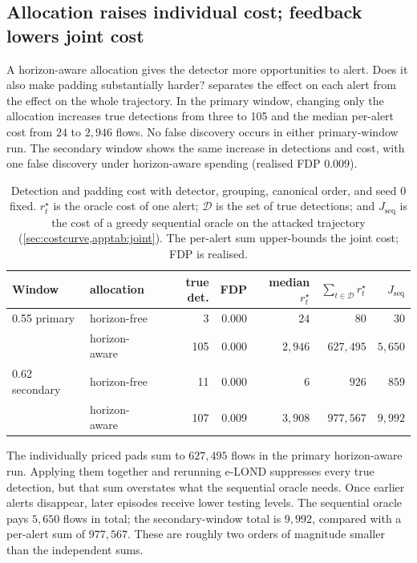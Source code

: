 \documentclass[conference]{IEEEtran}
\begin{document}
\subsection{Allocation raises individual cost; feedback lowers joint cost}\label{sec:costcurve}

A horizon-aware allocation gives the detector more opportunities to alert. Does it also make padding
substantially harder?  separates the effect on each alert from the effect on the
whole trajectory. In the primary window, changing only the allocation increases true detections from
three to 105 and the median per-alert cost from $24$ to $2{,}946$ flows. No false discovery occurs
in either primary-window run. The secondary window shows the same increase in detections and cost,
with one false discovery under horizon-aware spending (realised FDP $0.009$).

\begin{table}[t]
\centering
\caption{Detection and padding cost with detector, grouping, canonical order, and seed 0 fixed.
$r^{\star}_t$ is the oracle cost of one alert; $\mathcal D$ is the set of true detections; and
$J_{\mathrm{seq}}$ is the cost of a greedy sequential oracle on the attacked trajectory
(\cref{sec:costcurve,apptab:joint}). The per-alert sum upper-bounds the joint cost; FDP is realised.}
\label{tab:costcurve}
\footnotesize
\setlength{\tabcolsep}{8pt}
\begin{tabular}{@{}llrrrrr@{}}
\toprule
Window & allocation & true det. & FDP & median $r^{\star}_t$ & $\sum_{t\in\mathcal D} r^{\star}_t$ & $J_{\mathrm{seq}}$ \\
\midrule
0.55 primary & horizon-free & 3 & 0.000 & $24$ & $80$ & $30$ \\
\quad & horizon-aware & 105 & 0.000 & $2{,}946$ & $627{,}495$ & $5{,}650$ \\
\midrule
0.62 secondary & horizon-free & 11 & 0.000 & $6$ & $926$ & $859$ \\
\quad & horizon-aware & 107 & 0.009 & $3{,}908$ & $977{,}567$ & $9{,}992$ \\
\bottomrule
\end{tabular}
\end{table}

The individually priced pads sum to $627{,}495$ flows in the primary horizon-aware run. Applying
them together and rerunning e-LOND suppresses every true detection, but that sum overstates what
the sequential oracle needs. Once earlier alerts disappear, later episodes receive lower testing
levels. The sequential oracle pays $5{,}650$ flows in total; the secondary-window total is
$9{,}992$, compared with a per-alert sum of $977{,}567$. These are roughly two orders of magnitude
smaller than the independent sums.
\end{document}
